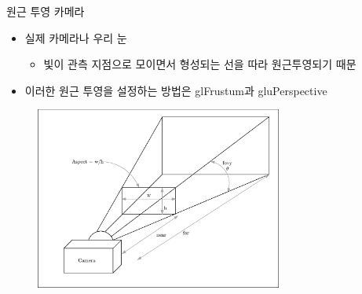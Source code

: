 \documentclass{beamer}
\begin{document}
\begin{frame}[fragile]{원근 투영 카메라}

\begin{itemize}
\item 실제 카메라나 우리 눈
	\begin{itemize}
	 있는 것은 작게 보이고 가까이 있는 것은 크게 보임
	\item 빛이 관측 지점으로 모이면서 형성되는 선을 따라 원근투영되기 때문
	\end{itemize}
\item 이러한 원근 투영을 설정하는 방법은 {\sf glFrustum}과 {\sf gluPerspective}
\end{itemize}

\begin{figure}[h!]
  \centering
    \includegraphics[height=6cm]{OGL_camera/perspectiveCam.eps}
\end{figure}

\end{frame}
\end{document}
